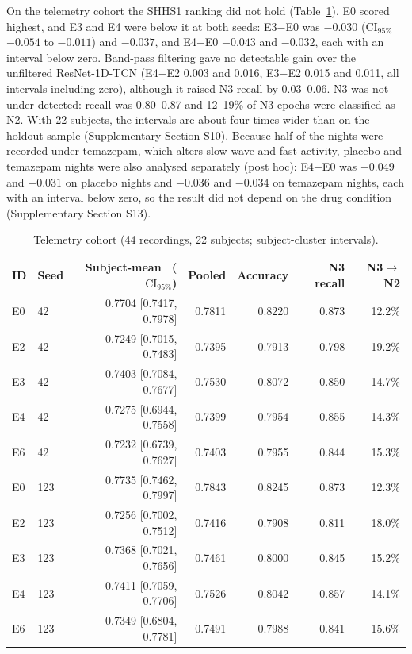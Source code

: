 \documentclass[11pt,a4paper]{article}
\newcommand{\mf}{\text{macro-F1}}
\newcommand{\ci}{\ensuremath{\mathrm{CI}_{95\%}}}
\begin{document}
On the telemetry cohort the SHHS1 ranking did not hold (Table~\ref{tab:telemetry}). E0 scored highest, and E3
and E4 were below it at both seeds: E3$-$E0 was $-0.030$ (\ci\ $-0.054$ to $-0.011$) and $-0.037$, and
E4$-$E0 $-0.043$ and $-0.032$, each with an interval below zero. Band-pass filtering gave no
detectable gain over the unfiltered ResNet-1D-TCN (E4$-$E2 0.003 and 0.016, E3$-$E2 0.015 and 0.011,
all intervals including zero), although it raised N3 recall by 0.03--0.06. N3 was not under-detected:
recall was 0.80--0.87 and 12--19\% of N3 epochs were classified as N2. With 22 subjects, the intervals
are about four times wider than on the holdout sample (Supplementary Section S10). Because half of the
nights were recorded under temazepam, which alters slow-wave and fast activity, placebo and temazepam
nights were also analysed separately (post hoc): E4$-$E0 was $-0.049$ and $-0.031$ on placebo nights
and $-0.036$ and $-0.034$ on temazepam nights, each with an interval below zero, so the result did not
depend on the drug condition (Supplementary Section S13).

\begin{table}[t]
\centering
\caption{Telemetry cohort (44 recordings, 22 subjects; subject-cluster intervals).}
\label{tab:telemetry}
\small
\begin{tabular}{llrrrrr}
\toprule
\textbf{ID} & \textbf{Seed} & \textbf{Subject-mean \mf\ (\ci)} & \textbf{Pooled \mf} & \textbf{Accuracy} & \textbf{N3 recall} & \textbf{N3$\to$N2} \\
\midrule
E0 & 42  & 0.7704 [0.7417, 0.7978] & 0.7811 & 0.8220 & 0.873 & 12.2\% \\
E2 & 42  & 0.7249 [0.7015, 0.7483] & 0.7395 & 0.7913 & 0.798 & 19.2\% \\
E3 & 42  & 0.7403 [0.7084, 0.7677] & 0.7530 & 0.8072 & 0.850 & 14.7\% \\
E4 & 42  & 0.7275 [0.6944, 0.7558] & 0.7399 & 0.7954 & 0.855 & 14.3\% \\
E6 & 42  & 0.7232 [0.6739, 0.7627] & 0.7403 & 0.7955 & 0.844 & 15.3\% \\
\addlinespace
E0 & 123 & 0.7735 [0.7462, 0.7997] & 0.7843 & 0.8245 & 0.873 & 12.3\% \\
E2 & 123 & 0.7256 [0.7002, 0.7512] & 0.7416 & 0.7908 & 0.811 & 18.0\% \\
E3 & 123 & 0.7368 [0.7021, 0.7656] & 0.7461 & 0.8000 & 0.845 & 15.2\% \\
E4 & 123 & 0.7411 [0.7059, 0.7706] & 0.7526 & 0.8042 & 0.857 & 14.1\% \\
E6 & 123 & 0.7349 [0.6804, 0.7781] & 0.7491 & 0.7988 & 0.841 & 15.6\% \\
\bottomrule
\end{tabular}
\end{table}
\end{document}
